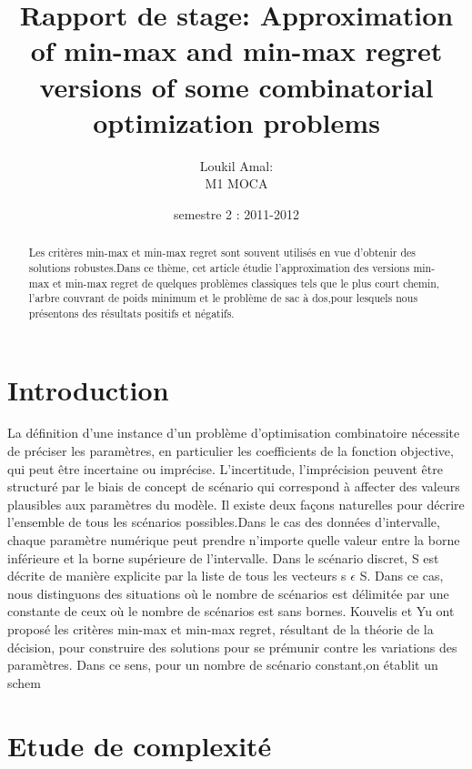 \documentclass[a4paper, 12pt]{report}
\title{Rapport de stage: Approximation of min-max and min-max regret versions of some combinatorial optimization problems}
\author{Loukil Amal: \\ M1 MOCA}
\date{semestre 2 : 2011-2012}
\begin{document}
 

\maketitle

\begin{abstract}
Les critères min-max et min-max regret sont souvent utilisés en vue d'obtenir des solutions robustes.Dans ce thème, cet article étudie l'approximation des versions min-max et min-max regret de quelques problèmes classiques tels que le plus court chemin, l'arbre couvrant de poids minimum et le problème de sac à dos,pour lesquels nous présentons des résultats positifs et négatifs.
\end{abstract}


\pagebreak

\tableofcontents

\pagebreak

\listoftables
\pagebreak

\section{Introduction}

La définition d'une instance d'un problème d'optimisation combinatoire nécessite de préciser les paramètres, en particulier les coefficients de la fonction objective, qui peut être incertaine ou imprécise.
L'incertitude, l'imprécision peuvent être structuré par le biais de concept de scénario qui correspond à affecter des valeurs plausibles aux paramètres du modèle.
Il existe deux façons naturelles pour décrire l'ensemble de tous les scénarios possibles.Dans le cas des données d'intervalle, chaque paramètre numérique peut prendre n'importe quelle valeur entre la borne inférieure et la borne supérieure de l'intervalle. Dans le scénario discret, S est décrite de manière explicite par la liste de tous les vecteurs s $\epsilon$ S. Dans ce cas, nous distinguons des situations où le nombre de scénarios est délimitée par une constante de ceux où le nombre de scénarios est sans bornes.
Kouvelis et Yu ont proposé les critères min-max et min-max regret, résultant de la théorie de la décision, pour construire des solutions pour se prémunir contre les variations des paramètres.
Dans ce sens, pour un nombre de scénario constant,on établit un schem

\section{Etude de complexité}
\end{document}
